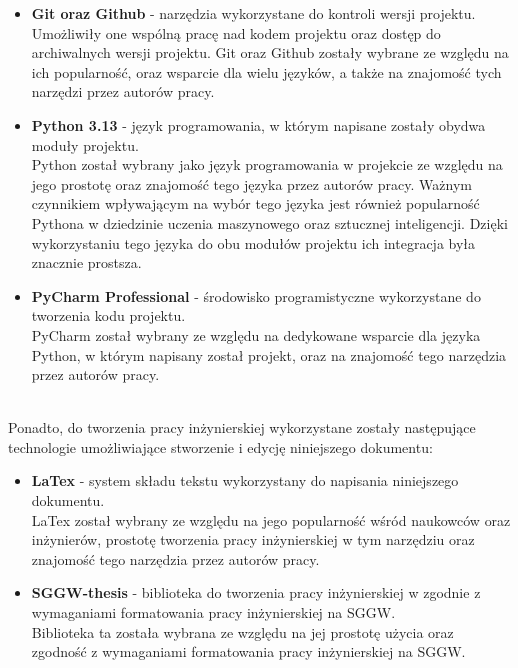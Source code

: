 \begin{itemize}
    \item \textbf{Git oraz Github} - narzędzia wykorzystane do kontroli
    wersji projektu.\\ Umożliwiły one wspólną pracę nad kodem projektu oraz
    dostęp do archiwalnych wersji projektu. Git oraz Github zostały wybrane
    ze względu na ich popularność, oraz wsparcie dla wielu języków, a także
    na znajomość tych narzędzi przez autorów pracy.
    \item \textbf{Python 3.13} - język programowania, w którym napisane
    zostały obydwa moduły projektu.\\ Python został wybrany jako język
    programowania w projekcie ze względu na jego prostotę oraz
    znajomość tego języka przez autorów pracy. Ważnym czynnikiem wpływającym
    na wybór tego języka jest również popularność Pythona w dziedzinie
    uczenia maszynowego oraz sztucznej inteligencji. Dzięki wykorzystaniu
    tego języka do obu modułów projektu ich integracja była znacznie prostsza.
    \item \textbf{PyCharm Professional}  - środowisko programistyczne
    wykorzystane do tworzenia kodu projektu.\\PyCharm został wybrany ze
    względu na dedykowane wsparcie dla języka Python, w którym napisany
    został projekt, oraz na znajomość tego narzędzia przez autorów pracy.
\end{itemize}

\\Ponadto, do tworzenia pracy inżynierskiej wykorzystane zostały następujące
technologie umożliwiające stworzenie i edycję niniejszego dokumentu:

\begin{itemize}
    \item \textbf{LaTex} - system składu tekstu wykorzystany do napisania
    niniejszego dokumentu.\\ LaTex został wybrany ze względu na jego
    popularność wśród naukowców oraz inżynierów, prostotę tworzenia pracy
    inżynierskiej w tym narzędziu oraz znajomość tego narzędzia przez autorów pracy.
    \item \textbf{SGGW-thesis} - biblioteka do tworzenia pracy inżynierskiej
    w \latex zgodnie z wymaganiami formatowania pracy inżynierskiej na SGGW.\\ Biblioteka ta została wybrana ze względu na jej prostotę użycia oraz zgodność z wymaganiami formatowania pracy inżynierskiej na SGGW.
\end{itemize}

